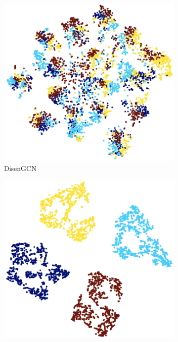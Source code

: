 \documentclass[accepted]{uai2021} %
\begin{document}
\begin{figure}[t]
     \centering
     \begin{subfigure}[b]{0.235\textwidth}
         \centering
         \includegraphics[width=1\columnwidth]{disengcn_bad.png}
         \caption{\small{DisenGCN}}
         \label{fig:disengcn_bad}
     \end{subfigure}
     \hfill
     \begin{subfigure}[b]{0.235\textwidth}
         \centering
         \includegraphics[width=1\columnwidth]{lgd_good.png}

\end{subfigure}
\end{figure}
\end{document}
